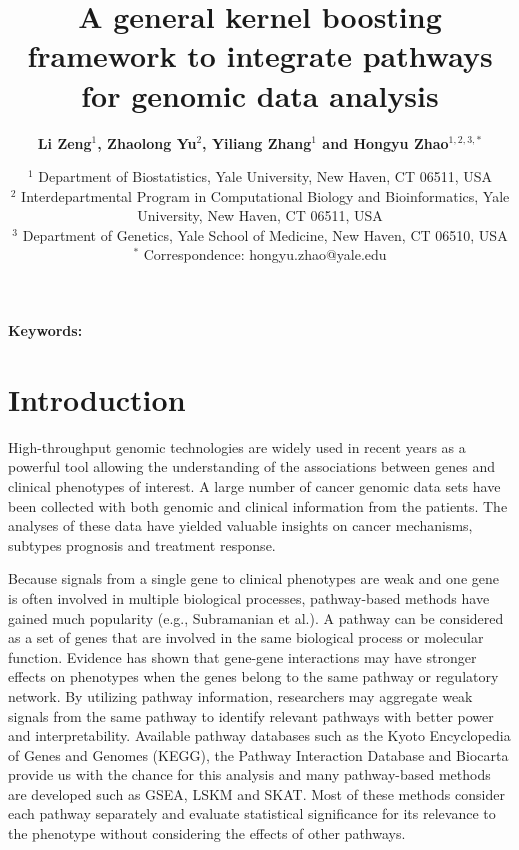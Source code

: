 \documentclass[a4paper,12pt]{article}
\begin{document}
	\title{\bf A general kernel boosting framework to integrate pathways for genomic data analysis}
	\author{\bf Li Zeng$^{1}$, Zhaolong Yu$^2$, Yiliang Zhang$^1$ and Hongyu Zhao$^{1,2,3,*}$}
	\date{
		$^1$ Department of Biostatistics, Yale University, New Haven, CT 06511, USA\\
	$^2$ Interdepartmental Program in Computational Biology and Bioinformatics, Yale University, New Haven, CT 06511, USA\\
	$^3$ Department of Genetics, Yale School of Medicine, New Haven, CT 06510, USA\\
	$^*$ Correspondence: hongyu.zhao@yale.edu
}
	\maketitle
	\begin{abstract}
		\end{abstract}

		\begin{center}
			\textbf{Keywords:}
			\end{center}

	
	\section{Introduction}
	High-throughput genomic technologies are widely used in recent years as a powerful tool allowing the understanding of the associations between genes and clinical phenotypes of interest. A large number of cancer genomic data sets have been collected with both genomic and clinical information from the patients. The analyses of these data have yielded valuable insights on cancer mechanisms, subtypes prognosis and treatment response. 
	
	Because signals from a single gene to clinical phenotypes are weak and one gene is often involved in multiple biological processes, pathway-based methods have gained much popularity (e.g., Subramanian et al.).\cite{subramanian2005gene} A pathway can be considered as a set of genes that are involved in the same biological process or molecular function. Evidence has shown that gene-gene interactions may have stronger effects on phenotypes when the genes belong to the same pathway or regulatory network.\cite{carlson2004mapping} By utilizing pathway information, researchers may aggregate weak signals from the same pathway to identify relevant pathways with better power and interpretability. Available pathway databases such as the Kyoto Encyclopedia of Genes and Genomes (KEGG), \cite{kanehisa2000kegg} the Pathway Interaction Database \cite{schaefer2008pid} and Biocarta\cite{nishimura2001biocarta} provide us with the chance for this analysis and many pathway-based methods are developed such as GSEA,\cite{subramanian2005gene} LSKM \cite{liu2007semiparametric} and SKAT. \cite{wu2011rare} Most of these methods consider each pathway separately and evaluate statistical significance for its relevance to the phenotype without considering the effects of other pathways.
	
\end{document}
